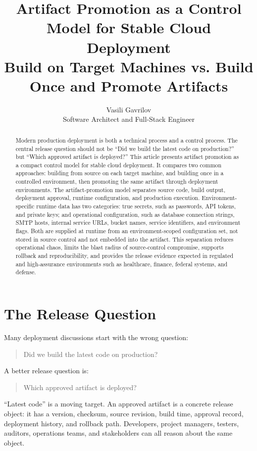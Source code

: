\documentclass[11pt]{article}
\title{Artifact Promotion as a Control Model for Stable Cloud Deployment\\
\large Build on Target Machines vs. Build Once and Promote Artifacts}
\author{Vasili Gavrilov\\Software Architect and Full-Stack Engineer}
\date{}
\begin{document}
\maketitle

\begin{abstract}
Modern production deployment is both a technical process and a control process. The central release question should not be ``Did we build the latest code on production?'' but ``Which approved artifact is deployed?'' This article presents artifact promotion as a compact control model for stable cloud deployment. It compares two common approaches: building from source on each target machine, and building once in a controlled environment, then promoting the same artifact through deployment environments. The artifact-promotion model separates source code, build output, deployment approval, runtime configuration, and production execution. Environment-specific runtime data has two categories: true secrets, such as passwords, API tokens, and private keys; and operational configuration, such as database connection strings, SMTP hosts, internal service URLs, bucket names, service identifiers, and environment flags. Both are supplied at runtime from an environment-scoped configuration set, not stored in source control and not embedded into the artifact. This separation reduces operational chaos, limits the blast radius of source-control compromise, supports rollback and reproducibility, and provides the release evidence expected in regulated and high-assurance environments such as healthcare, finance, federal systems, and defense.
\end{abstract}

\section{The Release Question}

Many deployment discussions start with the wrong question:

\begin{quote}
Did we build the latest code on production?
\end{quote}

A better release question is:

\begin{quote}
Which approved artifact is deployed?
\end{quote}

``Latest code'' is a moving target. An approved artifact is a concrete release object: it has a version, checksum, source revision, build time, approval record, deployment history, and rollback path. Developers, project managers, testers, auditors, operations teams, and stakeholders can all reason about the same object.
\end{document}
